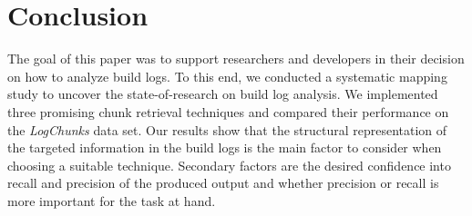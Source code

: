 \section{Conclusion}
\label{sec:conclusion-fw}
The goal of this paper was to support researchers and developers in
their decision on how to analyze build logs.
To this end, we conducted a systematic mapping study to uncover the
state-of-research on build log analysis.
We implemented three promising chunk retrieval techniques and
compared their performance on the \emph{LogChunks} data set.
Our results show that the structural
representation of the targeted information in the build logs is the
main factor to consider when choosing a suitable technique.
Secondary
factors are the desired confidence into recall and precision of the
produced output and whether precision or recall is more important for
the task at hand.

